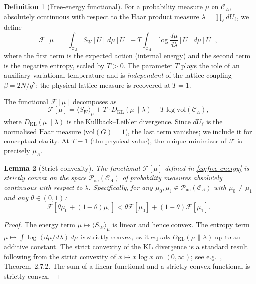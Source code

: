 \documentclass[12pt,a4paper]{article}
\theoremstyle{definition}
\newtheorem{definition}{Definition}[section]
\theoremstyle{plain}
\newtheorem{lemma}[definition]{Lemma}
\theoremstyle{remark}
\begin{document}
\begin{definition}[Free-energy functional]
\label{def:free-energy}
For a probability measure $\mu$ on $\mathcal{C}_\Lambda$, absolutely continuous with respect to the Haar product measure $\lambda = \prod_\ell dU_\ell$, we define
\begin{equation}\label{eq:free-energy}
    \mathcal{F}[\mu] = \int_{\mathcal{C}_\Lambda} S_W[U]\, d\mu[U] + T \int_{\mathcal{C}_\Lambda} \log \frac{d\mu}{d\lambda}[U]\, d\mu[U],
\end{equation}
where the first term is the expected action (internal energy) and the second term is the negative entropy, scaled by $T > 0$. The parameter $T$ plays the role of an auxiliary variational temperature and is \emph{independent} of the lattice coupling $\beta = 2N/g^2$; the physical lattice measure is recovered at $T = 1$.
\end{definition}

The functional $\mathcal{F}[\mu]$ decomposes as
\begin{equation}
    \mathcal{F}[\mu] = \langle S_W \rangle_\mu + T \cdot D_{\mathrm{KL}}(\mu \| \lambda) - T \log \mathrm{vol}(\mathcal{C}_\Lambda),
\end{equation}
where $D_{\mathrm{KL}}(\mu \| \lambda)$ is the Kullback--Leibler divergence. Since $dU_\ell$ is the normalised Haar measure ($\mathrm{vol}(G) = 1$), the last term vanishes; we include it for conceptual clarity. At $T = 1$ (the physical value), the unique minimizer of $\mathcal{F}$ is precisely $\mu_\Lambda$.

\begin{lemma}[Strict convexity]
\label{lem:strict-convexity}
The functional $\mathcal{F}[\mu]$ defined in \eqref{eq:free-energy} is strictly convex on the space $\mathcal{P}_{\mathrm{ac}}(\mathcal{C}_\Lambda)$ of probability measures absolutely continuous with respect to $\lambda$. Specifically, for any $\mu_0, \mu_1 \in \mathcal{P}_{\mathrm{ac}}(\mathcal{C}_\Lambda)$ with $\mu_0 \neq \mu_1$ and any $\theta \in (0,1)$:
\begin{equation}
    \mathcal{F}[\theta \mu_0 + (1-\theta)\mu_1] < \theta \mathcal{F}[\mu_0] + (1-\theta) \mathcal{F}[\mu_1].
\end{equation}
\end{lemma}

\begin{proof}
The energy term $\mu \mapsto \langle S_W \rangle_\mu$ is linear and hence convex. The entropy term $\mu \mapsto \int \log(d\mu/d\lambda)\, d\mu$ is strictly convex, as it equals $D_{\mathrm{KL}}(\mu \| \lambda)$ up to an additive constant. The strict convexity of the KL divergence is a standard result following from the strict convexity of $x \mapsto x \log x$ on $(0, \infty)$; see e.g.\ \cite{CoverThomas2006}, Theorem~2.7.2. The sum of a linear functional and a strictly convex functional is strictly convex.
\end{proof}
\end{document}
